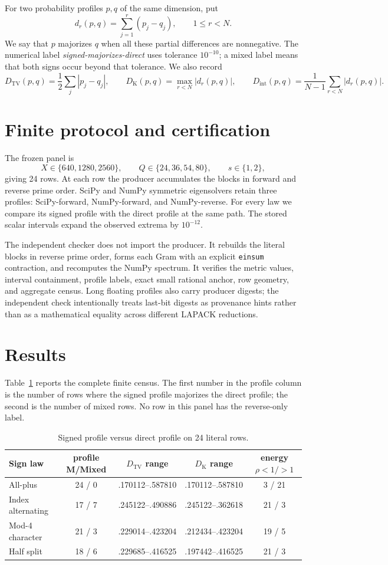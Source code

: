 \documentclass[10pt]{article}
\newcommand{\TV}{D_{\mathrm{TV}}}
\newcommand{\DK}{D_{\mathrm{K}}}
\newcommand{\DI}{D_{\mathrm{int}}}
\begin{document}
For two probability profiles \(p,q\) of the same dimension, put
\[
 d_r(p,q)=\sum_{j=1}^r(p_j-q_j),\qquad 1\leq r<N.
\]
We say that \(p\) majorizes \(q\) when all these partial differences are
nonnegative.  The numerical label
\textit{signed-majorizes-direct} uses tolerance \(10^{-10}\); a mixed
label means that both signs occur beyond that tolerance.  We also record
\[
 \TV(p,q)=\frac12\sum_j|p_j-q_j|,\qquad
 \DK(p,q)=\max_{r<N}|d_r(p,q)|,\qquad
 \DI(p,q)=\frac1{N-1}\sum_{r<N}|d_r(p,q)|.
 \]

\section{Finite protocol and certification}

The frozen panel is
\[
 X\in\{640,1280,2560\},\qquad Q\in\{24,36,54,80\},\qquad s\in\{1,2\},
\]
giving 24 rows.  At each row the producer accumulates the blocks in forward
and reverse prime order.  SciPy and NumPy symmetric eigensolvers retain
three profiles: SciPy-forward, NumPy-forward, and NumPy-reverse.  For every
law we compare its signed profile with the direct profile at the same path.
The stored scalar intervals expand the observed extrema by \(10^{-12}\).

The independent checker does not import the producer.  It rebuilds the
literal blocks in reverse prime order, forms each Gram with an explicit
\texttt{einsum} contraction, and recomputes the NumPy spectrum.  It verifies
the metric values, interval containment, profile labels, exact small rational
anchor, row geometry, and aggregate census.  Long floating profiles also
carry producer digests; the independent check intentionally treats last-bit
digests as provenance hints rather than as a mathematical equality across
different LAPACK reductions.

\section{Results}

Table~\ref{tab:law} reports the complete finite census.  The first number in
the profile column is the number of rows where the signed profile majorizes
the direct profile; the second is the number of mixed rows.  No row in this
panel has the reverse-only label.

\begin{table}[H]
\centering
\small
\caption{Signed profile versus direct profile on 24 literal rows.}
\label{tab:law}
\begin{tabular}{l c c c c}
\toprule
Sign law & profile M/Mixed & $\TV$ range & $\DK$ range & energy $\rho<1/>1$\\
\midrule
All-plus & 24 / 0 & .170112--.587810 & .170112--.587810 & 3 / 21\\
Index alternating & 17 / 7 & .245122--.490886 & .245122--.362618 & 21 / 3\\
Mod-4 character & 21 / 3 & .229014--.423204 & .212434--.423204 & 19 / 5\\
Half split & 18 / 6 & .229685--.416525 & .197442--.416525 & 21 / 3\\
\bottomrule
\end{tabular}
\end{table}
\end{document}
